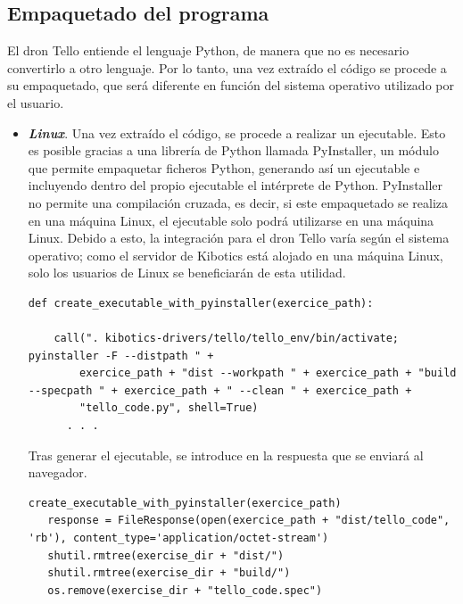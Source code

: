 \documentclass{report}
\begin{document}
\subsection{Empaquetado del programa}

El dron Tello entiende el lenguaje Python, de manera que no es necesario convertirlo a otro lenguaje. Por lo tanto, una vez extraído el código se procede a su empaquetado, que será diferente en función del sistema operativo utilizado por el usuario.
\\
\begin{itemize}
	\item \textit{\textbf{Linux}}. Una vez extraído el código, se procede a realizar un ejecutable. Esto es posible gracias a una librería de Python llamada PyInstaller, un módulo que permite empaquetar ficheros Python, generando así un ejecutable e incluyendo dentro del propio ejecutable el intérprete de Python. PyInstaller no permite una compilación cruzada, es decir, si este empaquetado se realiza en una máquina Linux, el ejecutable solo podrá utilizarse en una máquina Linux. Debido a esto, la integración para el dron Tello varía según el sistema operativo; como el servidor de Kibotics está alojado en una máquina Linux, solo los usuarios de Linux se beneficiarán de esta utilidad.
\begin{lstlisting}[frame=single,breaklines=true, label=Creación ejecutable con PyInstaller, caption=Creación ejecutable con PyInstaller,  captionpos=b]
   def create_executable_with_pyinstaller(exercice_path):
    		      
   	call(". kibotics-drivers/tello/tello_env/bin/activate; pyinstaller -F --distpath " +
      	exercice_path + "dist --workpath " + exercice_path + "build --specpath " + exercice_path + " --clean " + exercice_path +
      	"tello_code.py", shell=True)
      . . . 
\end{lstlisting}
	Tras generar el ejecutable, se introduce en la respuesta que se enviará al navegador.
	\\
\begin{lstlisting}[frame=single,breaklines=true, label=Respuesta a la petición para Linux, caption=Respuesta a la petición para Linux,  captionpos=b]
   create_executable_with_pyinstaller(exercice_path)
   response = FileResponse(open(exercice_path + "dist/tello_code", 'rb'), content_type='application/octet-stream')
   shutil.rmtree(exercise_dir + "dist/")
   shutil.rmtree(exercise_dir + "build/")
   os.remove(exercise_dir + "tello_code.spec")
\end{lstlisting}
	

\end{itemize}
\end{document}
